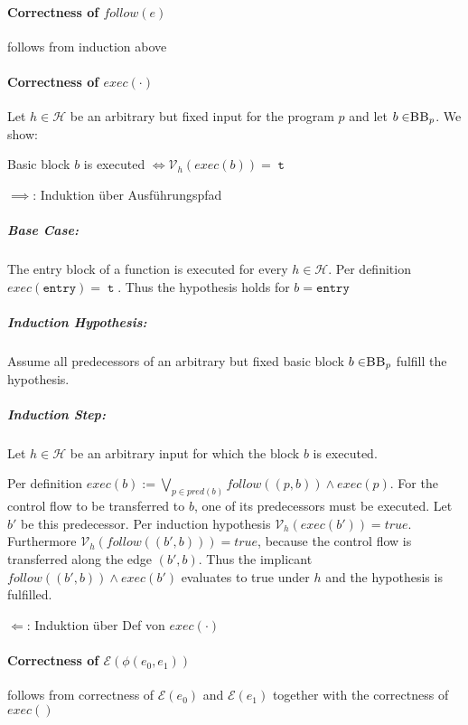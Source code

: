 \paragraph{Correctness of $follow(e)$}
follows from induction above

\paragraph{Correctness of $exec(\cdot)$}
Let $h \in \mathcal{H}$ be an arbitrary but fixed input for the program $p$ and let $b \in \mbb_p$. We show:
\begin{center}
    Basic block $b$ is executed $\iff \mathcal{V}_h(exec(b)) = \mttt$ 
\end{center}

$\implies$: Induktion über Ausführungspfad

\subparagraph{Base Case:} The entry block of a function is executed for every $h \in \mathcal{H}$. Per definition $exec(\mathtt{entry}) = \mttt$. Thus the hypothesis holds for $b = \mathtt{entry}$

\subparagraph{Induction Hypothesis:} Assume all predecessors of an arbitrary but fixed basic block $b \in \mbb_p$ fulfill the hypothesis.

\subparagraph{Induction Step:} Let $h \in \mathcal{H}$ be an arbitrary input for which the block $b$ is executed.

Per definition $exec(b) := \bigvee\limits_{p \in pred(b)} follow((p, b)) \land exec(p)$. For the control flow to be transferred to $b$, one of its predecessors must be executed. Let $b'$ be this predecessor. Per induction hypothesis $\mathcal{V}_h(exec(b')) = true$. Furthermore $\mathcal{V}_h(follow((b', b))) = true$, because the control flow is transferred along the edge $(b', b)$. Thus the implicant $follow((b', b)) \land exec(b')$ evaluates to true under $h$ and the hypothesis is fulfilled.



$\Longleftarrow$: Induktion über Def von $exec(\cdot)$

\paragraph{Correctness of $\mathcal{E}(\phi(e_0, e_1))$}
follows from correctness of $\mathcal{E}(e_0)$ and $\mathcal{E}(e_1)$ together with the correctness of $exec()$


